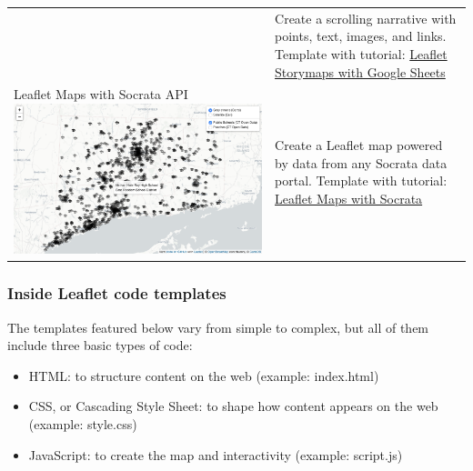 \documentclass[
  english,
]{book}
\providecommand{\tightlist}{%
  \setlength{\itemsep}{0pt}\setlength{\parskip}{0pt}}
\begin{document}
\begin{longtable}[]{@{}ll@{}}
\begin{minipage}[t]{0.47\columnwidth}
\end{minipage} & \begin{minipage}[t]{0.47\columnwidth}\raggedright
Create a scrolling narrative with points, text, images, and links. Template with tutorial: \href{leaflet-storymaps-with-google-sheets}{Leaflet Storymaps with Google Sheets}\strut
\end{minipage}\tabularnewline
\begin{minipage}[t]{0.47\columnwidth}\raggedright
Leaflet Maps with Socrata API \includegraphics{images/13-leaflet/leaflet-socrata-api-control-layers.png}\strut
\end{minipage} & \begin{minipage}[t]{0.47\columnwidth}\raggedright
Create a Leaflet map powered by data from any Socrata data portal. Template with tutorial: \href{leaflet-maps-with-socrata}{Leaflet Maps with Socrata}\strut
\end{minipage}\tabularnewline
\bottomrule
\end{longtable}

\hypertarget{inside-leaflet-code-templates}{%
\subsubsection*{Inside Leaflet code templates}\label{inside-leaflet-code-templates}}

The templates featured below vary from simple to complex, but all of them include three basic types of code:

\begin{itemize}
\tightlist
\item
  HTML: to structure content on the web (example: index.html)
\item
  CSS, or Cascading Style Sheet: to shape how content appears on the web (example: style.css)
\item
  JavaScript: to create the map and interactivity (example: script.js)
\end{itemize}
\end{document}
